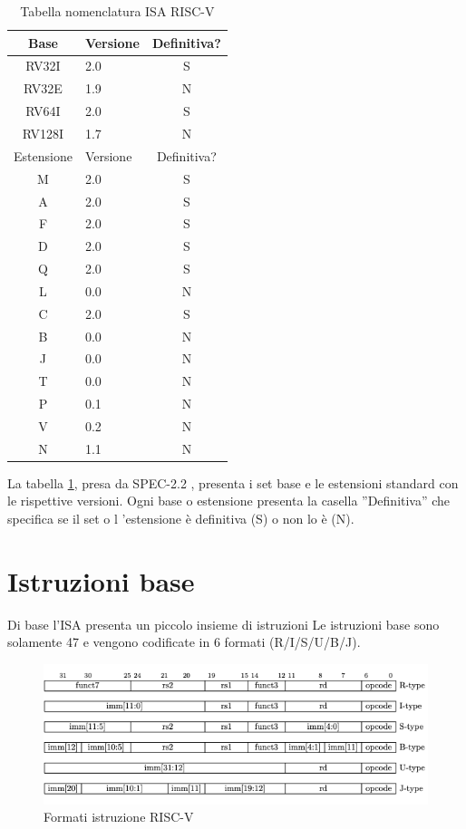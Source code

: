 \documentclass[12pt,a4paper]{report}
\begin{document}
\begin{table}
\centering
\begin{tabular}{|c|l|c|}
\hline
Base & Versione & Definitiva? \\
\hline
RV32I & 2.0 & S\\
RV32E & 1.9 & N\\
RV64I & 2.0 & S\\
RV128I & 1.7 & N\\
\hline
Estensione & Versione & Definitiva? \\
\hline
M & 2.0 & S\\
A & 2.0 & S\\
F & 2.0 & S\\
D & 2.0 & S\\
Q & 2.0 & S\\
L & 0.0 & N\\
C & 2.0 & S\\
B & 0.0 & N\\
J & 0.0 & N\\
T & 0.0 & N \\
P & 0.1 & N\\
V & 0.2 & N\\
N & 1.1 & N\\
\hline

\end{tabular}
	\caption{Tabella nomenclatura ISA RISC-V}
	\label{tab:nomenclaturaISA}
\end{table}

La tabella  \ref{tab:nomenclaturaISA}, presa da SPEC-2.2 \cite{ISA},  presenta i set base e le estensioni standard con le rispettive versioni. Ogni base o estensione presenta la casella ''Definitiva'' che specifica se il set o l 'estensione è definitiva (S) o non lo è (N).


\section{Istruzioni base}
Di base l'ISA presenta un piccolo insieme di istruzioni  Le istruzioni base sono solamente 47 e vengono codificate in 6 formati (R/I/S/U/B/J).  

\begin{figure}[h!]
	\includegraphics[width = \textwidth]{FormatiIstruzione.png}
	\caption{Formati istruzione RISC-V\cite{ISA}}
	\label{Fig:Formati_istruzioni_RV32I}
	
\end{figure}
\end{document}
